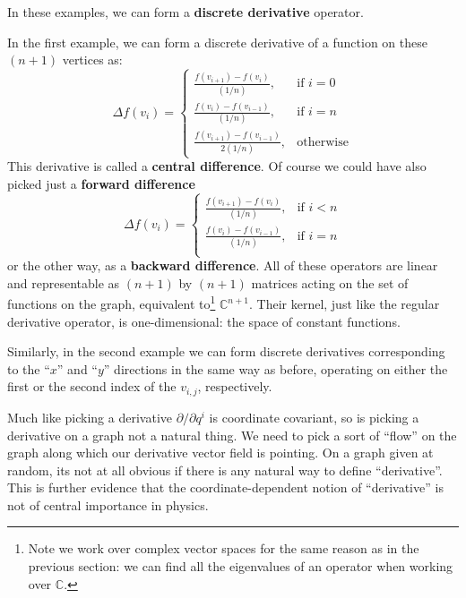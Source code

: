 	In these examples, we can form a \textbf{discrete derivative} operator. 
	\begin{example}
		In the first example, we can form a discrete derivative of a function on these $(n+1)$ vertices as:
		\begin{equation}
			\Delta f(v_i) = \begin{cases}
				\frac{f(v_{i+1}) - f(v_{i})}{(1/n)}, & \text{if } \textit{$i = 0$}\\
				\frac{f(v_{i}) - f(v_{i-1})}{(1/n)}, & \text{if } \textit{$i = n$}\\
				\frac{f(v_{i+1}) - f(v_{i-1})}{2 (1/n)}, & \text{otherwise}
			\end{cases}
		\end{equation}
		This derivative is called a \textbf{central difference}. Of course we could have also picked just a \textbf{forward difference}
		\begin{equation}
			\Delta f(v_i) = \begin{cases}
				\frac{f(v_{i+1}) - f(v_{i})}{(1/n)}, & \text{if } \textit{$i < n$}\\
				\frac{f(v_{i}) - f(v_{i-1})}{(1/n)}, & \text{if } \textit{$i = n$}\\
			\end{cases}
		\end{equation}
		or the other way, as a \textbf{backward difference}. All of these operators are linear and representable as $(n+1)$ by $(n+1)$ matrices acting on the set of functions on the graph, equivalent to\footnote{Note we work over complex vector spaces for the same reason as in the previous section: we can find all the eigenvalues of an operator when working over $\mathbb C$.} $\mathbb C^{n+1}$. Their kernel, just like the regular derivative operator, is one-dimensional: the space of constant functions. 
		
		Similarly, in the second example we can form discrete derivatives corresponding to the ``$x$'' and ``$y$'' directions in the same way as before, operating on either the first or the second index of the $v_{i,j}$, respectively. 
	\end{example}
	
	Much like picking a derivative $\partial/\partial q^i$ is coordinate covariant, so is picking a derivative on a graph not a natural thing. We need to pick a sort of ``flow'' on the graph along which our derivative vector field is pointing. On a graph given at random, its not at all obvious if there is any natural way to define ``derivative''. This is further evidence that the coordinate-dependent notion of ``derivative'' is not of central importance in physics. 
	
